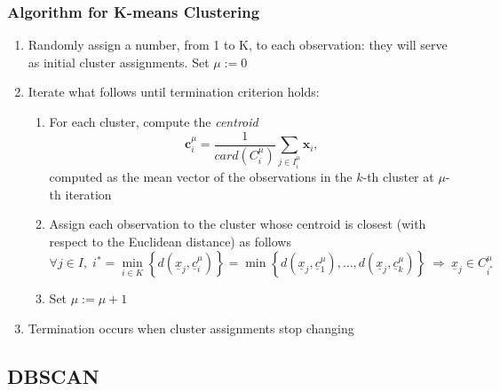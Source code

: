\documentclass[a4paper]{article}
\begin{document}
	\subsubsection{Algorithm for K-means Clustering}
	\begin{enumerate}
		\item Randomly assign a number, from 1 to K, to each observation: they will
		serve as initial cluster assignments. Set $\mu:=0$
		\item Iterate what follows until termination criterion holds:
		\begin{enumerate}
			\item For each cluster, compute the \textsl{centroid} 
			$$
			\boldsymbol{c}_{i}^{\mu}=\frac{1}{card(C_{i}^{\mu})}\underset{j\in I_{i}^{\mu}}{\sum}\boldsymbol{x}_{i},
			$$
			computed as the mean vector of the observations in the $k$-th cluster
			at $\mu$-th iteration
			\item Assign each observation to the cluster whose centroid is closest (with
			respect to the Euclidean distance) as follows
			$$
			\forall j\in I,\;i^{*}=\underset{i\in K}{\min}\left\{ d(\underline{x}_{j},\underline{c}_{i}^{\mu})\right\} =\min\left\{ d(\underline{x}_{j},\underline{c}_{1}^{\mu}),\ldots,d(\underline{x}_{j},\underline{c}_{k}^{\mu})\right\} \:\Longrightarrow\:\underline{x}_{j}\in C_{i^{*}}^{\mu}
			$$
			\item Set $\mu:=\mu+1$
		\end{enumerate}
		\item Termination occurs when cluster assignments stop changing
	\end{enumerate}
	
	\subsection{DBSCAN}
	
	
		
\end{document}
